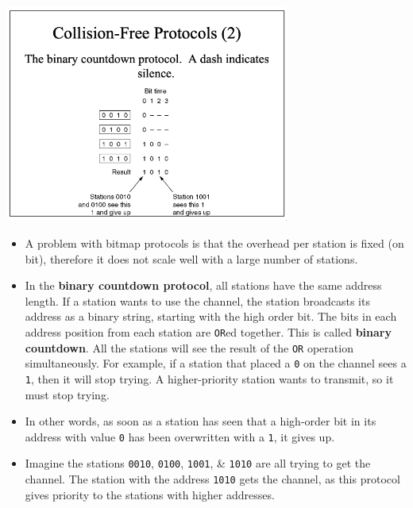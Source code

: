 \documentclass[11pt]{article}
\begin{document}
\begin{center}
    \includegraphics[width=0.7\textwidth]{binarycountdown.png}
\end{center}
\begin{itemize}
    \item   A problem with bitmap protocols is that the overhead per station is fixed (on bit), therefore 
            it does not scale well with a large number of stations. 
    \item   In the \textbf{binary countdown protocol}, all stations have the same address length.
            If a station wants to use the channel, the station broadcasts its address as a binary string, starting 
            with the high order bit.
            The bits in each address position from each station are \verb|OR|ed together. 
            This is called \textbf{binary countdown}.
            All the stations will see the result of the \verb|OR| operation simultaneously. 
            For example, if a station that placed a \verb|0| on the channel sees a \verb|1|, then it will stop trying.
            A higher-priority station wants to transmit, so it must stop trying.
    \item   In other words, as soon as a station has seen that a high-order bit in its address with value \verb|0| has 
            been overwritten with a \verb|1|, it gives up.
    \item   Imagine the stations \verb|0010|, \verb|0100|, \verb|1001|, \& \verb|1010| are all trying to get the 
            channel.
            The station with the address \verb|1010| gets the channel, as this protocol gives priority to the stations with 
            higher addresses.
\end{itemize}
\end{document}
